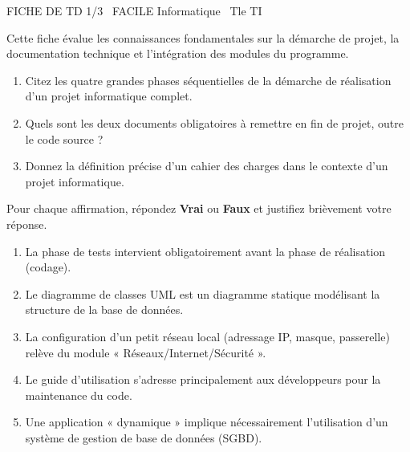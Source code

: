 \documentclass[11pt]{article}
\begin{document}
\begin{tcolorbox}[enhanced,colback=popink,colframe=popink,arc=10pt,boxrule=0pt,left=12pt,right=12pt,top=9pt,bottom=9pt]
{\color{white}\popxbold\small FICHE DE TD 1/3 \textbullet\ FACILE \hfill Informatique \textbullet\ Tle TI\par}
\end{tcolorbox}
\vspace{4pt}
Cette fiche évalue les connaissances fondamentales sur la démarche de projet, la documentation technique et l'intégration des modules du programme.

\begin{exercice}
\begin{enumerate}
    \item Citez les quatre grandes phases séquentielles de la démarche de réalisation d'un projet informatique complet.
    \item Quels sont les deux documents obligatoires à remettre en fin de projet, outre le code source ?
    \item Donnez la définition précise d'un cahier des charges dans le contexte d'un projet informatique.
\end{enumerate}
\end{exercice}

\begin{exercice}
Pour chaque affirmation, répondez \textbf{Vrai} ou \textbf{Faux} et justifiez brièvement votre réponse.
\begin{enumerate}
    \item La phase de tests intervient obligatoirement avant la phase de réalisation (codage).
    \item Le diagramme de classes UML est un diagramme statique modélisant la structure de la base de données.
    \item La configuration d'un petit réseau local (adressage IP, masque, passerelle) relève du module « Réseaux/Internet/Sécurité ».
    \item Le guide d'utilisation s'adresse principalement aux développeurs pour la maintenance du code.
    \item Une application « dynamique » implique nécessairement l'utilisation d'un système de gestion de base de données (SGBD).
\end{enumerate}
\end{exercice}
\end{document}
